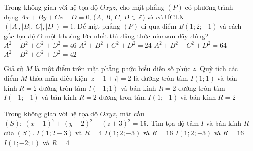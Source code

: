 \begin{ex}%
Trong không gian với hệ tọa độ $Oxyz$, cho mặt phẳng $(P)$ có phương trình dạng $Ax+By+Cz+D=0$, ($A$, $B$, $C$, $D\in\mathbb{Z}$) và có ƯCLN$\left(|A|,|B|,|C|,|D|\right)=1$. Để mặt phẳng $(P)$ đi qua điểm $B(1;2;-1)$ và cách gốc tọa độ $O$ một khoảng lớn nhất thì đẳng thức nào sau đây đúng?
\choice
{$A^2+B^2+C^2+D^2=46$}
{$A^2+B^2+C^2+D^2=24$}
{$A^2+B^2+C^2+D^2=64$}
{\True $A^2+B^2+C^2+D^2=42$}
\end{ex}

\begin{ex}%
Giả sử $M$ là một điểm trên mặt phẳng phức biểu diễn số phức $z$. Quỹ tích các điểm $M$ thỏa mãn điều kiện $|z-1+i|=2$ là
\choice
{đường tròn tâm $I(1;1)$ và bán kính $R=2$}
{đường tròn tâm $I(-1;1)$ và bán kính $R=2$}
{đường tròn tâm $I(-1;-1)$ và bán kính $R=2$}
{\True đường tròn tâm $I(1;-1)$ và bán kính $R=2$}
\end{ex}

\begin{ex}%
Trong không gian với hệ tọa độ $Oxyz$, mặt cầu $(S):\ (x-1)^2+(y-2)^2+(z+3)^2=16$. Tìm tọa độ tâm $I$ và bán kính $R$ của $(S)$.
\choice
{\True $I(1;2-3)$ và $R=4$}
{$I(1;2;-3)$ và $R=16$}
{$I(1;2;-3)$ và $R=16$}
{$I(1;-2;1)$ và $R=4$}
\end{ex}

